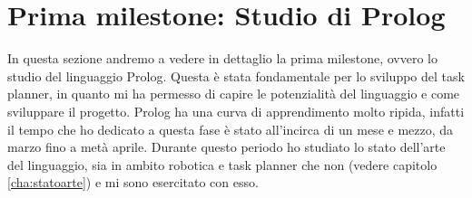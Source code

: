 \section{Prima milestone: Studio di Prolog}
\label{sec:studioprolog}
In questa sezione andremo a vedere in dettaglio la prima milestone, ovvero lo studio del linguaggio Prolog. Questa è stata fondamentale per lo sviluppo del task planner, in quanto mi ha permesso di capire le potenzialità del linguaggio e come sviluppare il progetto.
Prolog ha una curva di apprendimento molto ripida, infatti il tempo che ho dedicato a questa fase è stato all'incirca di un mese e mezzo, da marzo fino a metà aprile.
Durante questo periodo ho studiato lo stato dell'arte del linguaggio, sia in ambito robotica e task planner che non (vedere capitolo \ref{cha:statoarte}) e mi sono esercitato con esso.

